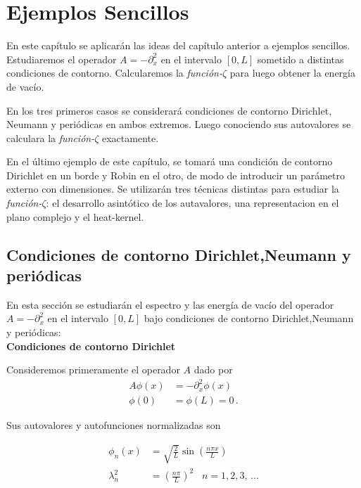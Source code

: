 \chapter{Ejemplos Sencillos}

En este capítulo se aplicarán las ideas del capítulo anterior a ejemplos sencillos. Estudiaremos el operador $A = - \partial ^2 _x$ en el intervalo $[0,L]$ sometido a distintas condiciones de contorno. Calcularemos la {\it función-$\zeta$} para luego obtener la energía de vacío. 

En los tres primeros casos se considerará condiciones de contorno Dirichlet, Neumann y periódicas en ambos extremos. Luego conociendo sus autovalores  se calculara la {\it función-$\zeta$} exactamente. 

En el último ejemplo de este capítulo, se tomará una condición de contorno Dirichlet en un borde y Robin en el otro, de modo de introducir un parámetro externo con dimensiones. Se utilizarán tres técnicas distintas para estudiar la {\it función-$\zeta$}: el desarrollo asintótico de los autavalores, una representacion en el plano complejo  y el heat-kernel.

\section{Condiciones de contorno Dirichlet,Neumann y periódicas}
\label{sec.Dirichlet}

En esta sección se estudiarán el espectro y las energía de vacío del operador $A = - \partial ^2 _x$ en el intervalo $[0,L]$ bajo condiciones de contorno Dirichlet,Neumann y periódicas:\\

\textbf{Condiciones de contorno Dirichlet}


Consideremos primeramente el operador $A$ dado por
\begin{equation}
\begin{aligned}
	A \phi (x) &= - \partial _x ^2 \phi (x) \\[10pt]
    \phi (0) &= \phi(L) = 0 
    \, .
\end{aligned}
\end{equation}

Sus autovalores y autofunciones normalizadas son

\begin{equation}
\begin{aligned}
	\phi _n (x) &= \sqrt{\frac{2}{L}} \sin( \frac{n \pi x}{L} ) \\[10pt]
	\lambda ^2 _n  &= \left( \frac{n \pi }{L} \right) ^2 \, \, \, \, \, n = 1,2,3, \, ...
\end{aligned}
\end{equation}

